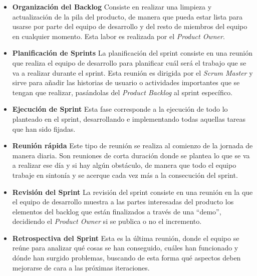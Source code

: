 \begin{itemize}
    \item \textbf{Organización del Backlog}
    \newline
    Consiste en realizar una limpieza y actualización de la pila del producto, de manera que pueda estar lista para
    usarse por parte del equipo de desarrollo y del resto de miembros del equipo en cualquier momento. Esta labor es realizada
    por el \textit{Product Owner}.

    \item \textbf{Planificación de Sprints}
    \newline
    La planificación del sprint consiste en una reunión que realiza el equipo de desarrollo para planificar cuál será
    el trabajo que se va a realizar durante el sprint. Esta reunión es dirigida por el \textit{Scrum Master} y sirve
    para añadir las historias de usuario o actividades importantes que se tengan que realizar, pasándolas del
    \textit{Product Backlog} al sprint específico.

    \item \textbf{Ejecución de Sprint}
    \newline
    Esta fase corresponde a la ejecución de todo lo planteado en el sprint, desarrollando e implementando todas aquellas
    tareas que han sido fijadas.

    \item \textbf{Reunión rápida}
    \newline
    Este tipo de reunión se realiza al comienzo de la jornada de manera diaria. Son reuniones de corta duración donde se
    plantea lo que se va a realizar ese día y si hay algún obstáculo, de manera que todo el equipo trabaje en sintonía y
    se acerque cada vez más a la consecución del sprint.

    \item \textbf{Revisión del Sprint}
    \newline
    La revisión del sprint consiste en una reunión en la que el equipo de desarrollo muestra a las partes interesadas del
    producto los elementos del backlog que están finalizados a través de una ``demo'', decidiendo el \textit{Product Owner}
    si se publica o no el incremento.

    \item \textbf{Retrospectiva del Sprint}
    \newline
    Esta es la última reunión, donde el equipo se reúne para analizar qué cosas se han conseguido, cuáles han funcionado y dónde han
    surgido problemas, buscando de esta forma qué aspectos deben mejorarse de cara a las próximas iteraciones.
\end{itemize}

